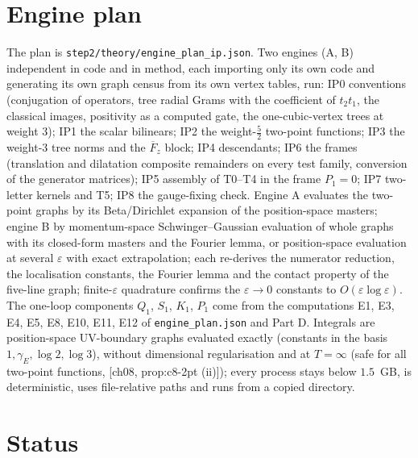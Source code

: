 \documentclass[11pt]{report}
\theoremstyle{plain}
\theoremstyle{definition}
\numberwithin{equation}{chapter}
\begin{document}
\section{Engine plan}

The plan is \texttt{step2/theory/engine\_plan\_ip.json}. Two engines (A, B) independent in code and in method, each importing only its own code and generating its own graph census from its own vertex tables, run: IP0 conventions (conjugation of operators, tree radial Grams with the coefficient of $t_2t_1$, the classical images, positivity as a computed gate, the one-cubic-vertex trees at weight $3$); IP1 the scalar bilinears; IP2 the weight-$\tfrac52$ two-point functions; IP3 the weight-$3$ tree norms and the $\overline F_z$ block; IP4 descendants; IP6 the frames (translation and dilatation composite remainders on every test family, conversion of the generator matrices); IP5 assembly of T0--T4 in the frame $P_1=0$; IP7 two-letter kernels and T5; IP8 the gauge-fixing check. Engine A evaluates the two-point graphs by its Beta/Dirichlet expansion of the position-space masters; engine B by momentum-space Schwinger--Gaussian evaluation of whole graphs with its closed-form masters and the Fourier lemma, or position-space evaluation at several $\varepsilon$ with exact extrapolation; each re-derives the numerator reduction, the localisation constants, the Fourier lemma and the contact property of the five-line graph; finite-$\varepsilon$ quadrature confirms the $\varepsilon\to0$ constants to $O(\varepsilon\log\varepsilon)$. The one-loop components $Q_1$, $S_1$, $K_1$, $P_1$ come from the computations E1, E3, E4, E5, E8, E10, E11, E12 of \texttt{engine\_plan.json} and Part D. Integrals are position-space UV-boundary graphs evaluated exactly (constants in the basis $1,\gamma_E,\log2,\log3$), without dimensional regularisation and at $T=\infty$ (safe for all two-point functions, [ch08, prop:c8-2pt (ii)]); every process stays below $1.5$~GB, is deterministic, uses file-relative paths and runs from a copied directory.

\section{Status}
\end{document}
